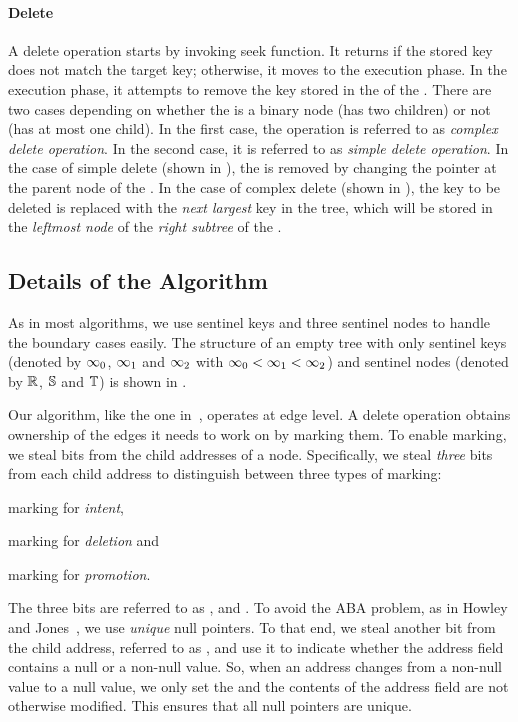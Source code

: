 \begin{limitscope}
\paragraph*{Delete} 
A delete operation starts by invoking seek function. It returns \false{} if the stored key does not match the target key; otherwise, it moves to the execution phase. In the execution phase, it attempts to remove the key stored in the \terminalnode{} of the \accesspath. There are two cases depending on whether the \terminalnode{} is a binary node (has two children) or not (has at most one child). In the first case, the operation is referred to as \emph{complex delete operation}. In the second case, it is referred to as \emph{simple delete operation}. In the case of simple delete (shown in ), the \terminalnode{} is removed by changing the pointer at the parent node of the \terminalnode. In the case of complex delete (shown in ), the key to be deleted is replaced with the \emph{next largest} key in the tree, which will be stored in the \emph{leftmost node} of the \emph{right subtree} of the \terminalnode.

\subsection{Details of the Algorithm}


As in most algorithms, we use sentinel keys and three sentinel nodes to handle the boundary cases easily.  The structure of an empty tree with only sentinel keys (denoted by $\infty_{0}$, $\infty_{1}$ and $\infty_{2}$ with $\infty_{0} < \infty_{1} < \infty_{2}$) and sentinel nodes (denoted by $\mathbb{R}$, $\mathbb{S}$ and $\mathbb{T}$) is shown in .


Our algorithm, like the one in~\cite{NatMit:2014:PPoPP}, operates at edge level. A delete operation obtains ownership of the edges it needs to work on by marking them. To enable marking, we steal bits from the child addresses of a node. Specifically, we steal \emph{three} bits from each child address to distinguish between three types of marking: 
\begin{enumerate*}[label=(\roman*)]
\item marking for \emph{intent}, 
\item marking for \emph{deletion} and 
\item marking for \emph{promotion}.
\end{enumerate*}
The three bits are referred to as \emph{\intentFlag}, \emph{\deleteFlag} and \emph{\promoteFlag}. To avoid the ABA problem, as in Howley and Jones~\cite{HowJon:2012:SPAA}, we use \emph{unique} null pointers. To that end, we steal another bit from the child address, referred to as \emph{\nullFlag}, and use it to indicate whether the address field contains a null or a non-null value. So, when an address changes from a non-null value to a null value, we only set the \nullFlag{} and the contents of the address field are not otherwise modified. This ensures that all null pointers are unique.


\end{limitscope}
